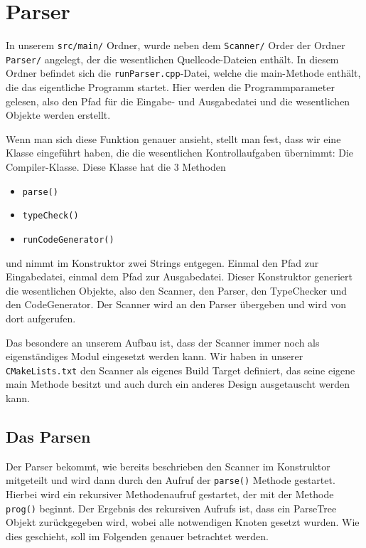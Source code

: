 \chapter{Parser}\label{chap:Parser}

In unserem \texttt{src/main/} Ordner, wurde neben dem \texttt{Scanner/} Order der Ordner \texttt{Parser/} angelegt, der die wesentlichen Quellcode-Dateien enthält. In diesem Ordner befindet sich die \texttt{runParser.cpp}-Datei, welche die main-Methode enthält, die das eigentliche Programm startet. Hier werden die Programmparameter gelesen, also den Pfad für die Eingabe- und Ausgabedatei und die wesentlichen Objekte werden erstellt.

Wenn man sich diese Funktion genauer ansieht, stellt man fest, dass wir eine Klasse eingeführt haben, die die wesentlichen Kontrollaufgaben übernimmt: Die Compiler-Klasse. Diese Klasse hat die 3 Methoden
\begin{itemize}
\item \texttt{parse()}
\item \texttt{typeCheck()}
\item \texttt{runCodeGenerator()}
\end{itemize}

und nimmt im Konstruktor zwei Strings entgegen. Einmal den Pfad zur Eingabedatei, einmal dem Pfad zur Ausgabedatei. Dieser Konstruktor generiert die wesentlichen Objekte, also den Scanner, den Parser, den TypeChecker und den CodeGenerator. Der Scanner wird an den Parser übergeben und wird von dort aufgerufen.

Das besondere an unserem Aufbau ist, dass der Scanner immer noch als eigenständiges Modul eingesetzt werden kann. Wir haben in unserer \texttt{CMakeLists.txt} den Scanner als eigenes Build Target definiert, das seine eigene main Methode besitzt und auch durch ein anderes Design ausgetauscht werden kann.

\section{Das Parsen}
Der Parser bekommt, wie bereits beschrieben den Scanner im Konstruktor mitgeteilt und wird dann durch den Aufruf der \texttt{parse()} Methode gestartet. Hierbei wird ein rekursiver Methodenaufruf gestartet, der mit der Methode \texttt{prog()} beginnt. Der Ergebnis des rekursiven Aufrufs ist, dass ein ParseTree Objekt zurückgegeben wird, wobei alle notwendigen Knoten gesetzt wurden. Wie dies geschieht, soll im Folgenden genauer betrachtet werden.

